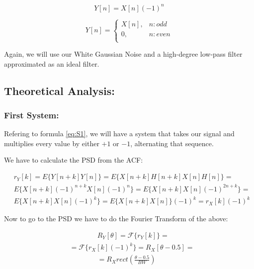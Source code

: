 \documentclass[a4paper,11pt]{article}
\begin{document}
\begin{equation}\label{eq:S1}
  Y[n] = X[n](-1)^n
\end{equation}

\begin{equation}
  Y[n] =
    \begin{cases}\label{eq:S2}
        X[n], & n: odd\\
        0,    & n: even\\
    \end{cases}
\end{equation}

Again, we will use our White Gaussian Noise and a high-degree low-pass filter
approximated as an ideal filter.

\subsection{Theoretical Analysis:}

\subsubsection{First System:}

Refering to formula \eqref{eq:S1}, we will have a system that takes our signal
and multiplies every value by either $+1$ or $-1$, alternating that sequence.

We have to calculate the PSD from the ACF:

\begin{equation}\label{eq:ACF_S1}
  \begin{split}
    & r_Y[k] = E\{Y[n+k]Y[n]\} =  E\{X[n+k]H[n+k]X[n]H[n]\} = \\
    & E\{X[n+k](-1)^{n+k}X[n](-1)^n\} = E\{X[n+k]X[n](-1)^{2n+k}\} = \\
    & E\{X[n+k]X[n](-1)^k\} = E\{X[n+k]X[n]\}(-1)^k = r_X[k](-1)^k
  \end{split}
\end{equation}

Now to go to the PSD we have to do the Fourier Transform of the above:

\begin{equation}\label{eq:R_hw}
  \begin{split}
    & \qquad\qquad R_Y[\theta] = \mathcal{F}\{r_Y[k]\} = \\
    & = \mathcal{F}\{r_X[k](-1)^k\} = R_X[\theta - 0.5] = \\
    & \qquad\qquad = R_X rect(\frac{\theta - 0.5}{BW})
  \end {split}
\end{equation}
\end{document}
